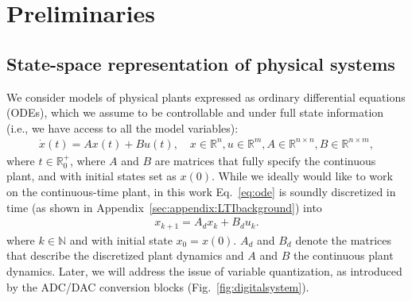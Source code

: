 \documentclass[runningheads,a4paper]{llncs}
\newcommand{\addtodo}[1]{{\color{red} TODO: #1}}
\begin{document}

\section{Preliminaries}
\label{sec:preliminaries}

\subsection{State-space representation of physical systems} 
\label{ssec:ssrepresentation}

We consider models of physical plants expressed as ordinary differential
equations (ODEs), which we assume to be controllable and under full state
information (i.e., we have access to all the model variables):
%
\begin{align}
\label{eq:ode}
\dot{x}(t) = Ax(t)+ B u(t), \quad x \in \mathbb{R}^{n}, u \in \mathbb{R}^m, A \in \mathbb{R}^{n \times n}, B \in \mathbb{R}^{n \times m}, 
\end{align}
%
where $t \in \mathbb R_0^+$, where $A$ and $B$ are matrices that fully
specify the continuous plant, and with initial states set as $x(0)$.  While
we ideally would like to work on the continuous-time plant, in this work
Eq.~\eqref{eq:ode} is soundly discretized in time (as shown in
Appendix~\ref{sec:appendix:LTIbackground}) into
%
%
\begin{align}
\label{eq:plant}
x_{k+1} = A_d x_k+ B_d u_k. 
\end{align} 
%
where $k \in \mathbb N$ and with initial state $x_{0}=x(0)$.  $A_d$ and
$B_d$ denote the matrices that describe the discretized plant dynamics and
$A$ and $B$ the continuous plant dynamics.  Later, we will address the
issue of variable quantization, as introduced by the ADC/DAC conversion
blocks (Fig.~\ref{fig:digitalsystem}).
\end{document}
